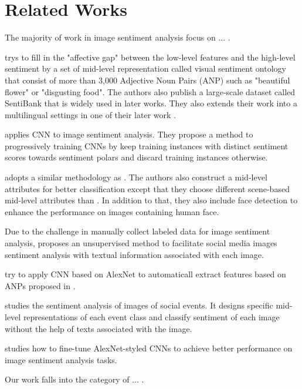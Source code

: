 \section{Related Works}
\label{relatedwork} 


The majority of work in image sentiment analysis focus on ... .

\cite{borth2013large} trys to fill in the "affective gap" between the low-level features and the high-level sentiment by a set of mid-level representation called visual sentiment ontology that consist of more than 3,000 Adjective Noun Pairs (ANP) such as "beautiful flower" or "disgusting food". The authors also publish a large-scale dataset called SentiBank that is widely used in later works. They also extends their work into a multilingual settings in one of their later work \cite{jou2015visual}. 

\cite{you2015robust} applies CNN to image sentiment analysis. They propose a method to progressively training CNNs by keep training instances with distinct sentiment scores towards sentiment polars and discard training instances otherwise.

\cite{yuan2013sentribute} adopts a similar methodology as \cite{borth2013large}. The authors also construct a mid-level attributes for better classification except that they choose different scene-based mid-level attributes than \cite{borth2013large}. In addition to that, they also include face detection to enhance the performance on images containing human face.


Due to the challenge in manually collect labeled data for image sentiment analysis, \cite{wang2015unsupervised} proposes an unsupervised method to facilitate social media images sentiment analysis with textual information associated with each image.

\cite{chen2014deepsentibank} try to apply CNN based on AlexNet \cite{krizhevsky2012imagenet} to automaticall extract features based on ANPs proposed in \cite{borth2013large}.

\cite{ahsan2017towards} studies the sentiment analysis of images of social events. It designs specific mid-level representations of each event class and classify sentiment of each image without the help of texts associated with the image.

\cite{campos2017pixels} studies how to fine-tune AlexNet-styled CNNs to achieve better performance on image sentiment analysis tasks.

Our work falls into the category of ... .
